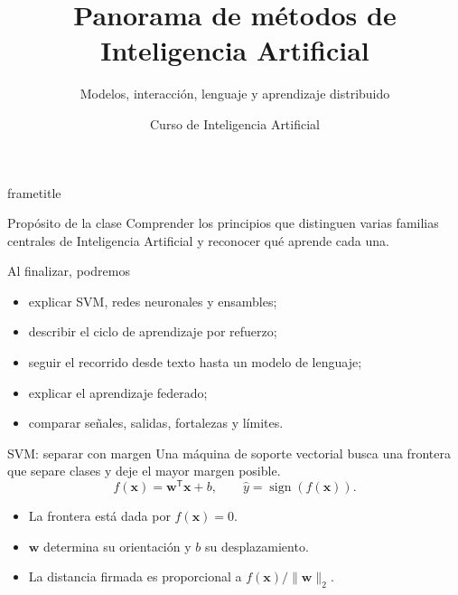 \documentclass[aspectratio=169,10pt]{beamer}
\title[IA · Clase 8]{Panorama de métodos de Inteligencia Artificial}
\subtitle{Modelos, interacción, lenguaje y aprendizaje distribuido}
\author{Curso de Inteligencia Artificial}
\institute{Semana 8 · Clase 8}
\date{}
\begin{document}
\begin{frame}[plain]
  \begin{beamercolorbox}[wd=\paperwidth,ht=\paperheight,sep=2em]{frametitle}
    \vfill
    {\Huge\bfseries\inserttitle\par}\vspace{.45em}
    {\color{UAPGold}\Large\insertsubtitle\par}\vspace{1.2em}
    \par
    \vfill {\color{UAPGold}\large\insertauthor\par}{\color{white}\insertinstitute\par}
  \end{beamercolorbox}
\end{frame}

\begin{frame}{Propósito de la clase}
  Comprender los principios que distinguen varias familias centrales de Inteligencia Artificial y reconocer qué aprende cada una.
  \begin{block}{Al finalizar, podremos}
    \begin{itemize}
      \item explicar SVM, redes neuronales y ensambles;
      \item describir el ciclo de aprendizaje por refuerzo;
      \item seguir el recorrido desde texto hasta un modelo de lenguaje;
      \item explicar el aprendizaje federado;
      \item comparar señales, salidas, fortalezas y límites.
    \end{itemize}
  \end{block}
\end{frame}

\begin{frame}{SVM: separar con margen}
  Una máquina de soporte vectorial busca una frontera que separe clases y deje el mayor margen posible.
  \[
    f(\mathbf{x})=\mathbf{w}^{\mathsf T}\mathbf{x}+b,
    \qquad \widehat y=\operatorname{sign}(f(\mathbf{x})).
  \]
  \begin{itemize}
    \item La frontera está dada por $f(\mathbf{x})=0$.
    \item $\mathbf{w}$ determina su orientación y $b$ su desplazamiento.
    \item La distancia firmada es proporcional a $f(\mathbf{x})/\|\mathbf{w}\|_2$.
  \end{itemize}
\end{frame}
\end{document}

